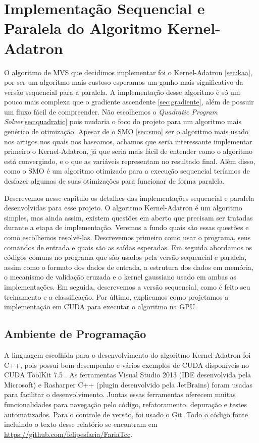 \chapter{Implementação Sequencial e Paralela do Algoritmo Kernel-Adatron}\label{chp:LABEL_CHP_4} %

O algoritmo de MVS que decidimos implementar foi o Kernel-Adatron \ref{sec:kaa}, por ser um algoritmo mais custoso esperamos um ganho mais significativo da versão sequencial para a paralela. A implementação desse algoritmo é só um pouco mais complexa que o gradiente ascendente \ref{sec:gradiente}, além de possuir um fluxo fácil de compreender. Não escolhemos o \emph{Quadratic Program Solver}\ref{sec:quadratic} pois mudaria o foco do projeto para um algoritmo mais genérico de otimização. Apesar de o SMO \ref{sec:smo} ser o algoritmo mais usado nos artigos nos quais nos baseamos, achamos que seria interessante implementar primeiro o Kernel-Adatron, já que seria mais fácil de entender como o algoritmo está convergindo, e o que as variáveis representam no resultado final. Além disso, como o SMO é um algoritmo otimizado para a execução sequencial teríamos de desfazer algumas de suas otimizações para funcionar de forma paralela.

Descrevemos nesse capítulo os detalhes das implementações sequencial e paralela desenvolvidas para esse projeto. O algoritmo Kernel-Adatron é um algoritmo simples, mas ainda assim, existem 
questões em aberto que precisam ser tratadas durante a etapa de implementação. Veremos a fundo quais são essas questões e como escolhemos resolvê-las. Descrevemos primeiro como usar o programa, seus comandos de entrada e quais são as saídas esperadas. Em seguida abordamos os códigos comuns no programa que são usados pela versão sequencial e paralela, assim como o formato dos dados de entrada, a estrutura dos dados em memória, o mecanismo de validação cruzada e o kernel gaussiano usado em ambas as implementações.
Em seguida, descrevemos a versão sequencial, como é feito seu treinamento e a classificação. Por último, explicamos como projetamos a implementação em CUDA para executar o algoritmo na GPU.

\section{Ambiente de Programação}
A linguagem escolhida para o desenvolvimento do algoritmo Kernel-Adatron foi C++, pois possui bom desempenho e vários exemplos de CUDA disponíveis no CUDA ToolKit 7.5 \cite{CUDA}. As ferramentas Visual Studio 2013 (IDE desenvolvida pela Microsoft) e Rasharper C++ (plugin desenvolvido pela JetBrains) foram usadas para facilitar o desenvolvimento. Juntas essas ferramentas oferecem muitas funcionalidades para navegação pelo código, refatoramento, depuração e testes automatizados. Para o controle de versão, foi usado o Git. Todo o código fonte incluindo o texto desse relatório se encontram em \url{https://github.com/felipesfaria/FariaTcc}.

